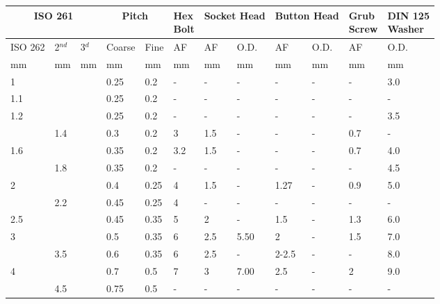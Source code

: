 \begin{table}[h!]
    \footnotesize
\begin{longtable}{lll|ll|llllll|l}
	\multicolumn{3}{c}{ISO 261}
    &\multicolumn{2}{c}{Pitch}
    &\specialcell{Hex\\Bolt}
    &\multicolumn{2}{c}{Socket Head}
    &\multicolumn{2}{c}{Button Head}
    &\specialcell{Grub\\Screw}
    &\specialcell{DIN 125\\Washer}
    \\
\hline
	ISO 262
    &2$^{nd}$
    &3$^{d}$
    &Coarse
    &Fine
    & AF %
    & AF %
    & O.D.
    & AF %
    & O.D.
    & AF %
    & O.D. %
    \\
\hline
	mm
    &mm
    &mm
    &mm
    &mm
    &mm
    &mm
    &mm
    &mm
    &mm
    &mm
    &mm
    \\
\hline
    1   &    &    &0.25 &0.2        &-   &-      &-      &-      &- &-    &3.0   \\
    1.1 &    &    &0.25 &0.2        &-   &-      &-      &-      &- &-    &-     \\
    1.2 &    &    &0.25 &0.2        &-   &-      &-      &-      &- &-    &3.5   \\
        &1.4 &    &0.3  &0.2        &3   &1.5    &-      &-      &- &0.7  &-     \\
    1.6 &    &    &0.35 &0.2        &3.2 &1.5    &-      &-      &- &0.7  &4.0   \\
        &1.8 &    &0.35 &0.2        &-   &-      &-      &-      &- &-    &4.5   \\
    2   &    &    &0.4  &0.25       &4   &1.5    &-      &1.27   &- &0.9  &5.0   \\
        &2.2 &    &0.45 &0.25       &4   &-      &-      &-      &- &-    &-     \\
    2.5 &    &    &0.45 &0.35       &5   &2      &-      &1.5    &- &1.3  &6.0   \\
    3   &    &    &0.5  &0.35       &6   &2.5    &5.50   &2      &- &1.5  &7.0   \\
        &3.5 &    &0.6  &0.35       &6   &2.5    &-      &2-2.5  &- &-    &8.0   \\
    4   &    &    &0.7  &0.5        &7   &3      &7.00   &2.5    &- &2    &9.0   \\
        &4.5 &    &0.75 &0.5        &-   &-      &-      &-      &- &-    &-     \\

\end{longtable}
\end{table}
